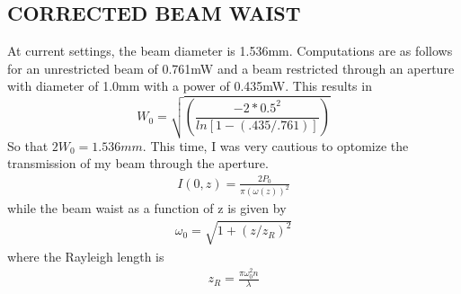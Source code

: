 \subsection{CORRECTED BEAM WAIST}
    At current settings, the beam diameter is 1.536mm. Computations are as follows for an unrestricted beam of 0.761mW and a beam restricted through an aperture with diameter of 1.0mm with a power of 0.435mW. This results in 
    \begin{equation}
        W_0 = \sqrt{\left( \frac{-2*0.5^2}{ln\left[1-(.435/.761)\right]}\right)}
    \end{equation}
    So that $ 2W_0 = 1.536mm$. This time, I was very cautious to optomize the transmission of my beam through the aperture.
\begin{gather}
    I(0,z)= \frac{2P_0}{\pi \left(\omega(z)\right)^2}
\end{gather}
while the beam waist as a function of z is given by
\begin{gather}
    \omega_0 = \sqrt{1+\left(z/z_R \right)^2}
\end{gather}
where the Rayleigh length is
\begin{gather}
    z_R = \frac{\pi \omega_0^2 n}{\lambda}
\end{gather}
